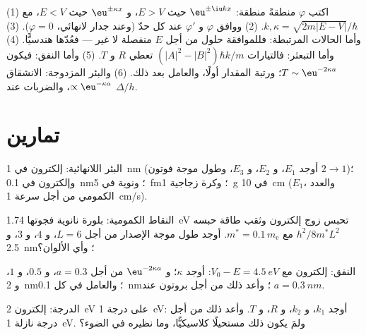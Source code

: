 \begin{method}\label{meth:b2:potential-wells-tunneling:method}
(1) اكتب $\varphi$ منطقةً منطقة: $\eu^{\pm\iu kx}$ حيث $E > V$،
و $\eu^{\pm\kappa x}$ حيث $E < V$، مع $k, \kappa = \sqrt{2m|E - V|}/\hbar$.
(2) ووافق $\varphi$ و $\varphi'$ عند كل حدّ (وعند جدار لانهائي،
$\varphi = 0$). (3) وأما الحالات المرتبطة: فللموافقة حلول من أجل
$E$ منفصلة لا غير --- فعُدّها هندسيًّا. (4) وأما التبعثر: فالتيارات
$(|A|^2 - |B|^2)\hbar k/m$ تعطي $R$ و $T$. (5) وأما النفق: فيكون $T \sim
\eu^{-2\kappa a}$؛ ورتبة المقدار أولًا، والعامل بعد ذلك. (6)
والبئر المزدوجة: الانشقاق $\propto\eu^{-\kappa a}$، والضربات عند $\Delta/h$.
\end{method}

\section{تمارين}

\begin{exercise}[$\star$]\label{exo:b2:potential-wells-tunneling:1}
البئر اللانهائية: إلكترون في \qty{1}{nm} (أوجد $E_1$، و $E_2$، و $E_3$، وطول موجة
فوتون $2 \to 1$)؛ وإلكترون في \qty{0.1}{nm}؛ ونوية في \qty{5}{fm}؛
وكرة زجاجية \qty{1}{g} في \qty{10}{cm} ($E_1$، والعدد الكمومي من أجل
سرعة \qty{1}{cm/s}).
\end{exercise}

\begin{exercise}[$\star$]\label{exo:b2:potential-wells-tunneling:2}
النقاط الكمومية: بلورة نانوية فجوتها \qty{1.74}{eV} تحبس زوج
إلكترون وثقب طاقة حبسه $h^2/8m^*L^2$ مع
$m^* = 0.1\,m_{\text{e}}$. أوجد طول موجة الإصدار من أجل $L = 6$، و $4$، و $3$،
و \qty{2.5}{nm}؛ وأي الألوان؟
\end{exercise}

\begin{exercise}[$\star$]\label{exo:b2:potential-wells-tunneling:3}
النفق: إلكترون مع $V_0 - E = \qty{4.5}{eV}$: أوجد $\kappa$؛ و $\eu^{-2\kappa a}$
من أجل $a = 0.3$، و $0.5$، و $1$، و \qty{2}{nm}؛ والعامل في كل \qty{0.1}{nm}؛ وأعد ذلك من أجل
بروتون عند $a = \qty{0.3}{nm}$.
\end{exercise}

\begin{exercise}[$\star$]\label{exo:b2:potential-wells-tunneling:4}
الدرجة: إلكترون \qty{2}{eV} على درجة \qty{1}{eV}: أوجد $k_1$، و $k_2$،
و $R$، و $T$. وأعد ذلك من أجل درجة نازلة \qty{1}{eV}. ولمَ يكون ذلك مستحيلًا
كلاسيكيًّا، وما نظيره في الضوء؟
\end{exercise}

